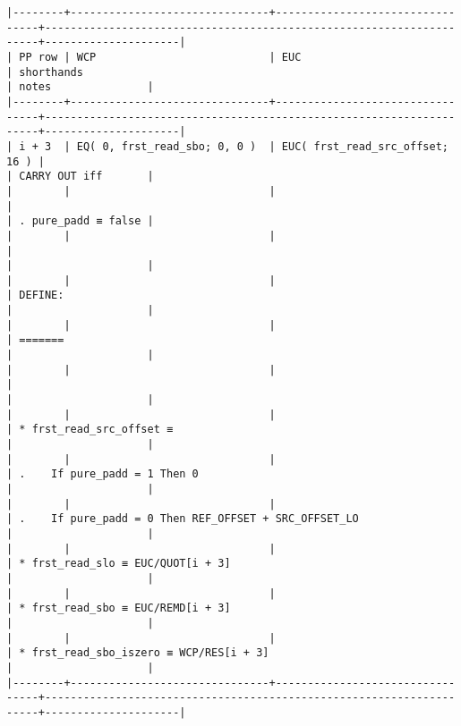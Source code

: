 \documentclass[varwidth=\maxdimen,margin=0.5cm,multi={verbatim}]{standalone}
\begin{document}
\begin{verbatim}
|--------+-------------------------------+---------------------------------+---------------------------------------------------------------------+---------------------|
| PP row | WCP                           | EUC                             | shorthands                                                          | notes               |
|--------+-------------------------------+---------------------------------+---------------------------------------------------------------------+---------------------|
| i + 3  | EQ( 0, frst_read_sbo; 0, 0 )  | EUC( frst_read_src_offset; 16 ) |                                                                     | CARRY OUT iff       |
|        |                               |                                 |                                                                     | . pure_padd ≡ false |
|        |                               |                                 |                                                                     |                     |
|        |                               |                                 | DEFINE:                                                             |                     |
|        |                               |                                 | =======                                                             |                     |
|        |                               |                                 |                                                                     |                     |
|        |                               |                                 | * frst_read_src_offset ≡                                            |                     |
|        |                               |                                 | .    If pure_padd = 1 Then 0                                        |                     |
|        |                               |                                 | .    If pure_padd = 0 Then REF_OFFSET + SRC_OFFSET_LO               |                     |
|        |                               |                                 | * frst_read_slo ≡ EUC/QUOT[i + 3]                                   |                     |
|        |                               |                                 | * frst_read_sbo ≡ EUC/REMD[i + 3]                                   |                     |
|        |                               |                                 | * frst_read_sbo_iszero ≡ WCP/RES[i + 3]                             |                     |
|--------+-------------------------------+---------------------------------+---------------------------------------------------------------------+---------------------|

\end{verbatim}
\end{document}
